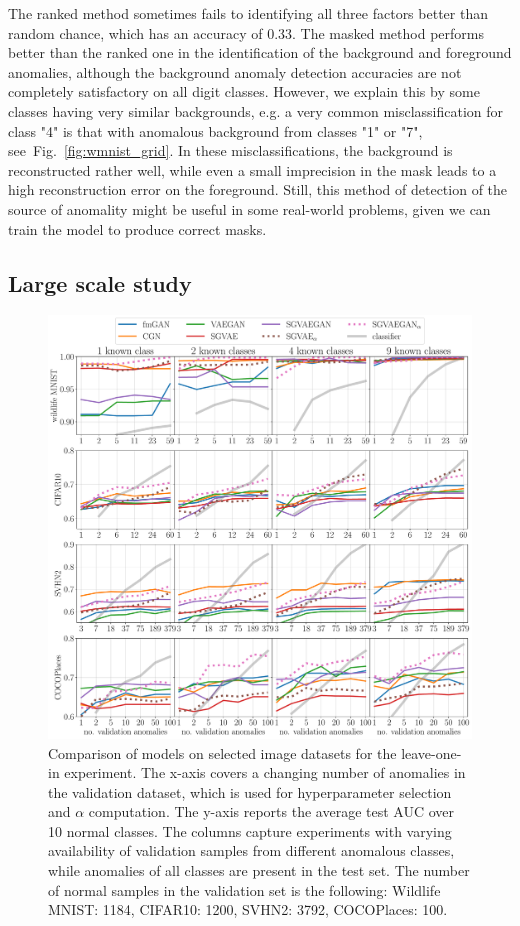 The ranked method sometimes fails to identifying all three factors better than random chance, which has an accuracy of 0.33. The masked method performs better than the ranked one in the identification of the background and foreground anomalies, although the background anomaly detection accuracies are not completely satisfactory on all digit classes. However, we explain this by some classes having very similar backgrounds, e.g. a very common misclassification for class "4" is that with anomalous background from classes "1" or "7", see~Fig.~\ref{fig:wmnist_grid}. In these misclassifications, the background is reconstructed rather well, while even a small imprecision in the mask leads to a high reconstruction error on the foreground. Still, this method of detection of the source of anomality might be useful in some real-world problems, given we can train the model to produce correct masks. 

\subsection{Large scale study} \label{sec:benchmarks}
\begin{figure}[ht!]
    \centering
        \includegraphics[width=\textwidth]{data/chapter_sgvaegan/fig8_all.pdf}
    \caption{Comparison of models on selected image datasets for the leave-one-in experiment. The x-axis covers a changing number of anomalies in the validation dataset, which is used for hyperparameter selection and $\alpha$ computation. The y-axis reports the average test AUC over 10 normal classes. The columns capture experiments with varying availability of validation samples from different anomalous classes, while anomalies of all classes are present in the test set. The number of normal samples in the validation set is the following: Wildlife MNIST: 1184, CIFAR10: 1200, SVHN2: 3792, COCOPlaces: 100.}
    \label{fig:kplots}
\end{figure}

